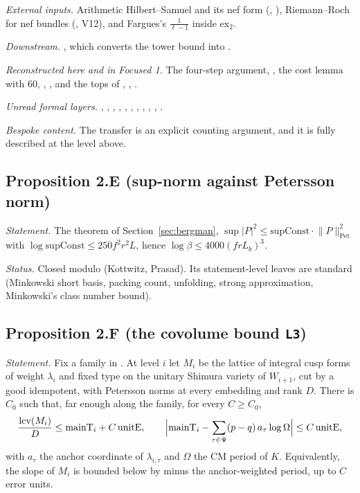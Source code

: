 \documentclass[11pt]{article}
\theoremstyle{remark}
\begin{document}
\emph{External inputs.} Arithmetic Hilbert--Samuel and its nef form (, ), Riemann--Roch for nef bundles (, V12), and Fargues's $\tfrac1{\ell-1}$ inside $\mathrm{ex}_2$.

\emph{Downstream.} , which converts the tower bound into .

\emph{Reconstructed here and in Focused 1.} The four-step argument, , the cost lemma with $60$, , , and the tops of , , .

\emph{Unread formal layers.} , , , , , , , , , , .

\emph{Bespoke content.} The transfer is an explicit counting argument, and it is fully described at the level above.

\subsection*{Proposition 2.E (sup-norm against Petersson norm)}

\emph{Statement.} The theorem of Section~\ref{sec:bergman}, $\sup\lvert P\rvert^2\le\mathrm{supConst}\cdot\lVert P\rVert^2_{\mathrm{Pet}}$ with $\log\mathrm{supConst}\le250f^2r^2L$, hence $\log\beta\le4000(frL_b)^3$.

\emph{Status.} Closed modulo  (Kottwitz, Prasad). Its statement-level leaves are standard (Minkowski short basis, packing count, unfolding, strong approximation, Minkowski's class number bound).

\subsection*{Proposition 2.F (the covolume bound \texttt{L3})}

\emph{Statement.} Fix a family in . At level $i$ let $M_i$ be the lattice of integral cusp forms of weight $\lambda_i$ and fixed type on the unitary Shimura variety of $W_{i+1}$, cut by a good idempotent, with Petersson norms at every embedding and rank $D$. There is $C_0$ such that, far enough along the family, for every $C\ge C_0$,
\[
\frac{\mathrm{lcv}(M_i)}{D}\le\mathrm{mainT}_i+C\,\mathrm{unitE},\qquad\Bigl\lvert\mathrm{mainT}_i-\sum_{\tau\in\Psi}(p-q)\,a_\tau\log\Omega\Bigr\rvert\le C\,\mathrm{unitE},
\]
with $a_\tau$ the anchor coordinate of $\lambda_{i,\tau}$ and $\Omega$ the CM period of $K$. Equivalently, the slope of $M_i$ is bounded below by minus the anchor-weighted period, up to $C$ error units.
\end{document}
